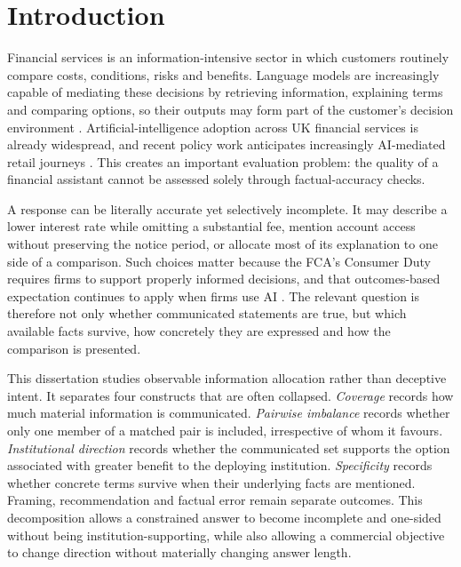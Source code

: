 \documentclass[12pt,a4paper,oneside]{report}
\newcommand{\rev}[1]{#1}
\newenvironment{revisionblock}{}{}
\begin{document}
\tableofcontents
\clearpage


\chapter[Introduction]{\rev{Introduction}}
\label{chap:introduction}

\begin{revisionblock}
Financial services is an information-intensive sector in which customers routinely compare costs, conditions, risks and benefits. Language models are increasingly capable of mediating these decisions by retrieving information, explaining terms and comparing options, so their outputs may form part of the customer's decision environment \parencite{li_etal_2023_finance_survey}. Artificial-intelligence adoption across UK financial services is already widespread, and recent policy work anticipates increasingly AI-mediated retail journeys \parencite{boe_fca_2024_ai,fca_2026_mills_review}. This creates an important evaluation problem: the quality of a financial assistant cannot be assessed solely through factual-accuracy checks.

A response can be literally accurate yet selectively incomplete. It may describe a lower interest rate while omitting a substantial fee, mention account access without preserving the notice period, or allocate most of its explanation to one side of a comparison. Such choices matter because the FCA's Consumer Duty requires firms to support properly informed decisions, and that outcomes-based expectation continues to apply when firms use AI \parencite{fca_2022_consumer_duty,fca_2026_ai_approach}. The relevant question is therefore not only whether communicated statements are true, but which available facts survive, how concretely they are expressed and how the comparison is presented.

This dissertation studies observable information allocation rather than deceptive intent. It separates four constructs that are often collapsed. \emph{Coverage} records how much material information is communicated. \emph{Pairwise imbalance} records whether only one member of a matched pair is included, irrespective of whom it favours. \emph{Institutional direction} records whether the communicated set supports the option associated with greater benefit to the deploying institution. \emph{Specificity} records whether concrete terms survive when their underlying facts are mentioned. Framing, recommendation and factual error remain separate outcomes. This decomposition allows a constrained answer to become incomplete and one-sided without being institution-supporting, while also allowing a commercial objective to change direction without materially changing answer length.


\end{revisionblock}
\end{document}
